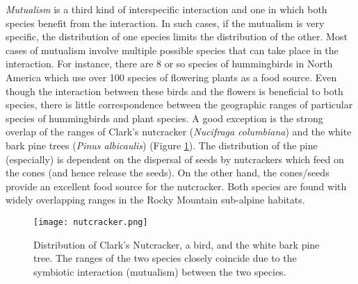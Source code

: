 \documentclass[12pt, oneside]{article}   	%
\begin{document}
\emph{Mutualism} is a third kind of interspecific interaction and one in which both species benefit from the interaction. In such cases, if the mutualism is very specific, the distribution of one species limits the distribution of the other. Most cases of mutualism involve multiple possible species that can take place in the interaction. For instance, there are 8 or so species of hummingbirds in North America which use over 100 species of flowering plants as a food source. Even though the interaction between these birds and the flowers is beneficial to both species, there is little correspondence between the geographic ranges of particular species of hummingbirds and plant species. A good exception is the strong overlap of the ranges of Clark's nutcracker (\emph{Nucifraga columbiana}) and the white bark pine trees (\emph{Pinus albicaulis}) (Figure \ref{nutcracker}). The distribution of the pine (especially) is dependent on the dispersal of seeds by nutcrackers which feed on the cones (and hence release the seeds). On the other hand, the cones/seeds provide an excellent food source for the nutcracker. Both species are found with widely overlapping ranges in the Rocky Mountain sub-alpine habitats.

\begin{figure}[hb]
	\centering
	\texttt{[image: nutcracker.png]}
	\caption{Distribution of Clark's Nutcracker, a bird, and the white bark pine tree. The ranges of the two species closely coincide due to the symbiotic interaction (mutualism) between the two species.\label{nutcracker}}
\end{figure}
\end{document}
